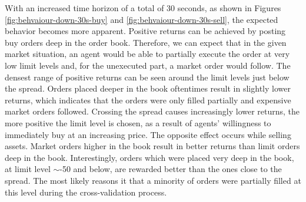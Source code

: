 With an increased time horizon of a total of 30 seconds, as shown in Figures \ref{fig:behvaiour-down-30s-buy} and \ref{fig:behvaiour-down-30s-sell}, the expected behavior becomes more apparent.
Positive returns can be achieved by posting buy orders deep in the order book.
Therefore, we can expect that in the given market situation, an agent would be able to partially execute the order at very low limit levels and, for the unexecuted part, a market order would follow.
The densest range of positive returns can be seen around the limit levels just below the spread.
Orders placed deeper in the book oftentimes result in slightly lower returns, which indicates that the orders were only filled partially and expensive market orders followed.
Crossing the spread causes increasingly lower returns, the more positive the limit level is chosen, as a result of agents' willingness to immediately buy at an increasing price.
The opposite effect occurs while selling assets.
Market orders higher in the book result in better returns than limit orders deep in the book.
Interestingly, orders which were placed very deep in the book, at limit level $\sim$-50 and below, are rewarded better than the ones close to the spread.
The most likely reasons it that a minority of orders  were partially filled at this level during the cross-validation process.

